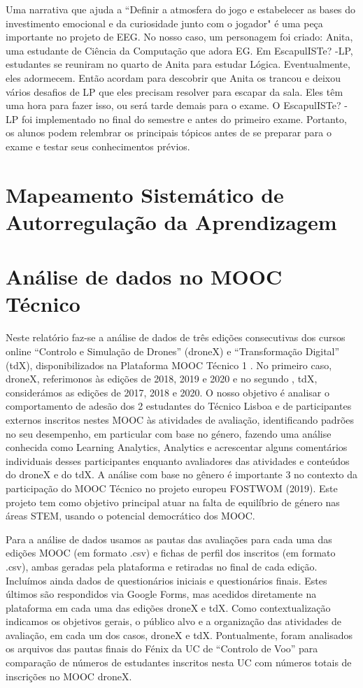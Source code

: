 Uma narrativa que ajuda a “Definir a atmosfera do jogo e estabelecer as bases do investimento emocional e da curiosidade junto com o jogador" \citep{clarke_escaped_2017} é uma peça importante no projeto de EEG. No nosso caso, um personagem foi criado: Anita, uma estudante de Ciência da Computação que adora EG. Em EscapulISTe? -LP, estudantes se reuniram no quarto de Anita para estudar Lógica. Eventualmente, eles adormecem. Então acordam para descobrir que Anita os trancou e deixou vários desafios de LP que eles precisam resolver para escapar da sala. Eles têm uma hora para fazer isso, ou será tarde demais para o exame. O EscapulISTe? -LP foi implementado no final do semestre e antes do primeiro exame. Portanto, os alunos podem relembrar os principais tópicos antes de se preparar para o exame e testar seus conhecimentos prévios.


\section{Mapeamento Sistemático de Autorregulação da Aprendizagem}

\section{Análise de dados no MOOC Técnico}

Neste relatório faz-se a análise de dados de três edições consecutivas dos cursos online “Controlo e Simulação de Drones” (droneX) e “Transformação Digital” (tdX), disponibilizados na Plataforma MOOC Técnico 1 . No primeiro caso, droneX, referimonos às edições de 2018, 2019 e 2020 e no segundo , tdX, considerámos as edições de 2017, 2018 e 2020. O nosso objetivo é analisar o comportamento de adesão dos 2
estudantes do Técnico Lisboa e de participantes externos inscritos nestes MOOC às atividades de avaliação, identificando padrões no seu desempenho, em particular com base no género, fazendo uma análise conhecida como Learning Analytics, Analytics e acrescentar alguns comentários individuais desses participantes enquanto avaliadores das atividades e conteúdos do droneX e do tdX. A análise com base no gênero é importante 3 no contexto da participação do MOOC Técnico no projeto
europeu FOSTWOM (2019). Este projeto tem como objetivo principal atuar na falta de equilíbrio de género nas áreas STEM, usando o potencial democrático dos MOOC.

Para a análise de dados usamos as pautas das avaliações para cada uma das edições
MOOC (em formato .csv) e fichas de perfil dos inscritos (em formato .csv), ambas
geradas pela plataforma e retiradas no final de cada edição. Incluímos ainda dados de
questionários iniciais e questionários finais. Estes últimos são respondidos via Google
Forms, mas acedidos diretamente na plataforma em cada uma das edições droneX e tdX. Como contextualização indicamos os objetivos gerais, o público alvo e a organização das atividades de avaliação, em cada um dos casos, droneX e tdX. Pontualmente, foram analisados os arquivos das pautas finais do Fénix  da UC  de “Controlo de Voo” para comparação de números de estudantes inscritos nesta UC com números totais de inscrições no MOOC droneX.

